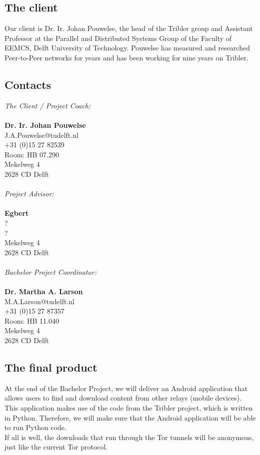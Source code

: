 \documentclass{article}
\begin{document}
\subsection{The client}
Our client is Dr. Ir. Johan Pouwelse, the head of the Tribler group and Assistant Professor at the Parallel and Distributed Systems Group of the Faculty of EEMCS, Delft University of Technology. Pouwelse has measured and researched Peer-to-Peer networks for years and has been working for nine years on Tribler.

\subsection{Contacts}

\emph{The Client / Project Coach:}\\\\
\textbf{Dr. Ir. Johan Pouwelse}\\
J.A.Pouwelse@tudelft.nl\\
+31 (0)15 27 82539\\
Room: HB 07.290\\
Mekelweg 4\\
2628 CD Delft\\\\

\emph{Project Advisor:}\\\\
\textbf{Egbert}\\
?\\ 
?\\
Mekelweg 4\\
2628 CD Delft\\\\

\emph{Bachelor Project Coordinator:}\\\\
\textbf{Dr. Martha A. Larson}\\
M.A.Larson@tudelft.nl\\
+31 (0)15 27 87357\\
Room: HB 11.040\\
Mekelweg 4\\
2628 CD Delft\\

\subsection{The final product}
At the end of the Bachelor Project, we will deliver an Android application that allows users to find and download content from other relays (mobile devices). This application makes use of the code from the Tribler project, which is written in Python. Therefore, we will make sure that the Android application will be able to run Python code.\\
If all is well, the downloads that run through the Tor tunnels will be anonymous, just like the current Tor protocol.
\end{document}
